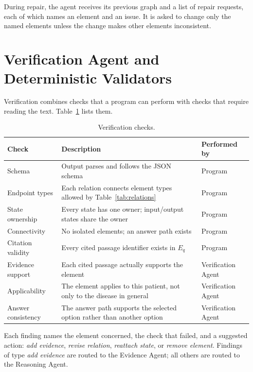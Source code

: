 During repair, the agent receives its previous graph and a list of repair requests, each of which names an element and an issue. It is asked to change only the named elements unless the change makes other elements inconsistent.

\section{Verification Agent and Deterministic Validators}
\label{sec:verification}

Verification combines checks that a program can perform with checks that require reading the text. Table~\ref{tab:checks} lists them.

\begin{table}[H]
\centering
\caption{Verification checks.}
\label{tab:checks}
\small
\begin{tabularx}{\linewidth}{l >{\raggedright\arraybackslash}X l}
\toprule
Check & Description & Performed by \\
\midrule
Schema & Output parses and follows the JSON schema & Program \\
Endpoint types & Each relation connects element types allowed by Table~\ref{tab:relations} & Program \\
State ownership & Every state has one owner; input/output states share the owner & Program \\
Connectivity & No isolated elements; an answer path exists & Program \\
Citation validity & Every cited passage identifier exists in $E_q$ & Program \\
Evidence support & Each cited passage actually supports the element & Verification Agent \\
Applicability & The element applies to this patient, not only to the disease in general & Verification Agent \\
Answer consistency & The answer path supports the selected option rather than another option & Verification Agent \\
\bottomrule
\end{tabularx}
\end{table}

Each finding names the element concerned, the check that failed, and a suggested action: \emph{add evidence}, \emph{revise relation}, \emph{reattach state}, or \emph{remove element}. Findings of type \emph{add evidence} are routed to the Evidence Agent; all others are routed to the Reasoning Agent.

